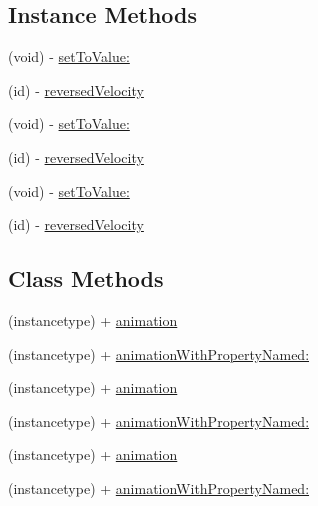 \subsection*{Instance Methods}
\begin{DoxyCompactItemize}
\item 
(void) -\/ \mbox{\hyperlink{interface_p_o_p_decay_animation_a1bf62f2b436ed5e5846f3a6b1bc0987b}{set\+To\+Value\+:}}
\item 
(id) -\/ \mbox{\hyperlink{interface_p_o_p_decay_animation_a2b10ea137ba9122567db921a68365fbe}{reversed\+Velocity}}
\item 
(void) -\/ \mbox{\hyperlink{interface_p_o_p_decay_animation_a1bf62f2b436ed5e5846f3a6b1bc0987b}{set\+To\+Value\+:}}
\item 
(id) -\/ \mbox{\hyperlink{interface_p_o_p_decay_animation_a2b10ea137ba9122567db921a68365fbe}{reversed\+Velocity}}
\item 
(void) -\/ \mbox{\hyperlink{interface_p_o_p_decay_animation_a1bf62f2b436ed5e5846f3a6b1bc0987b}{set\+To\+Value\+:}}
\item 
(id) -\/ \mbox{\hyperlink{interface_p_o_p_decay_animation_a2b10ea137ba9122567db921a68365fbe}{reversed\+Velocity}}
\end{DoxyCompactItemize}
\subsection*{Class Methods}
\begin{DoxyCompactItemize}
\item 
(instancetype) + \mbox{\hyperlink{interface_p_o_p_decay_animation_ada86965ca405f665e5e0ac41a2175e28}{animation}}
\item 
(instancetype) + \mbox{\hyperlink{interface_p_o_p_decay_animation_a09e82d62096c9c7b2eb9aac51a565e6f}{animation\+With\+Property\+Named\+:}}
\item 
(instancetype) + \mbox{\hyperlink{interface_p_o_p_decay_animation_ada86965ca405f665e5e0ac41a2175e28}{animation}}
\item 
(instancetype) + \mbox{\hyperlink{interface_p_o_p_decay_animation_a09e82d62096c9c7b2eb9aac51a565e6f}{animation\+With\+Property\+Named\+:}}
\item 
(instancetype) + \mbox{\hyperlink{interface_p_o_p_decay_animation_ada86965ca405f665e5e0ac41a2175e28}{animation}}
\item 
(instancetype) + \mbox{\hyperlink{interface_p_o_p_decay_animation_a09e82d62096c9c7b2eb9aac51a565e6f}{animation\+With\+Property\+Named\+:}}
\end{DoxyCompactItemize}
